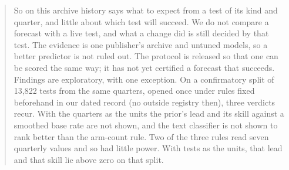 \documentclass[sigconf,nonacm]{acmart}
\begin{document}
\begin{abstract}
So on this archive history says what to expect from a test of its kind and quarter, and little about which test will succeed. We do not compare a forecast with a live test, and what a change did is still decided by that test. The evidence is one publisher's archive and untuned models, so a better predictor is not ruled out. The protocol is released so that one can be scored the same way; it has not yet certified a forecast that succeeds. Findings are exploratory, with one exception. On a confirmatory split of 13,822 tests from the same quarters, opened once under rules fixed beforehand in our dated record (no outside registry then), three verdicts recur. With the quarters as the units the prior's lead and its skill against a smoothed base rate are not shown, and the text classifier is not shown to rank better than the arm-count rule. Two of the three rules read seven quarterly values and so had little power. With tests as the units, that lead and that skill lie above zero on that split.
\end{abstract}
\end{document}
